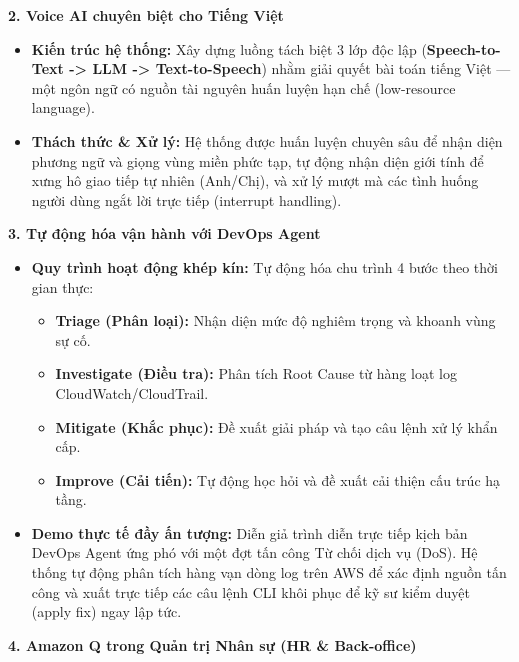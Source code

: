 \vspace{0.5em}\noindent\textbf{2. Voice AI chuyên biệt cho Tiếng Việt}

\begin{itemize}
\tightlist
\item
  \textbf{Kiến trúc hệ thống:} Xây dựng luồng tách biệt 3 lớp độc lập
  (\textbf{Speech-to-Text -\textgreater{} LLM -\textgreater{}
  Text-to-Speech}) nhằm giải quyết bài toán tiếng Việt --- một ngôn ngữ
  có nguồn tài nguyên huấn luyện hạn chế (low-resource language).
\item
  \textbf{Thách thức \& Xử lý:} Hệ thống được huấn luyện chuyên sâu để
  nhận diện phương ngữ và giọng vùng miền phức tạp, tự động nhận diện
  giới tính để xưng hô giao tiếp tự nhiên (Anh/Chị), và xử lý mượt mà
  các tình huống người dùng ngắt lời trực tiếp (interrupt handling).
\end{itemize}

\vspace{0.5em}\noindent\textbf{3. Tự động hóa vận hành với DevOps Agent}

\begin{itemize}
\tightlist
\item
  \textbf{Quy trình hoạt động khép kín:} Tự động hóa chu trình 4 bước
  theo thời gian thực:

  \begin{itemize}
  \tightlist
  \item
    \textbf{Triage (Phân loại):} Nhận diện mức độ nghiêm trọng và khoanh
    vùng sự cố.
  \item
    \textbf{Investigate (Điều tra):} Phân tích Root Cause từ hàng loạt
    log CloudWatch/CloudTrail.
  \item
    \textbf{Mitigate (Khắc phục):} Đề xuất giải pháp và tạo câu lệnh xử
    lý khẩn cấp.
  \item
    \textbf{Improve (Cải tiến):} Tự động học hỏi và đề xuất cải thiện
    cấu trúc hạ tầng.
  \end{itemize}
\item
  \textbf{Demo thực tế đầy ấn tượng:} Diễn giả trình diễn trực tiếp kịch
  bản DevOps Agent ứng phó với một đợt tấn công Từ chối dịch vụ (DoS).
  Hệ thống tự động phân tích hàng vạn dòng log trên AWS để xác định
  nguồn tấn công và xuất trực tiếp các câu lệnh CLI khôi phục để kỹ sư
  kiểm duyệt (apply fix) ngay lập tức.
\end{itemize}

\vspace{0.5em}\noindent\textbf{4. Amazon Q trong Quản trị Nhân sự (HR \& Back-office)}

